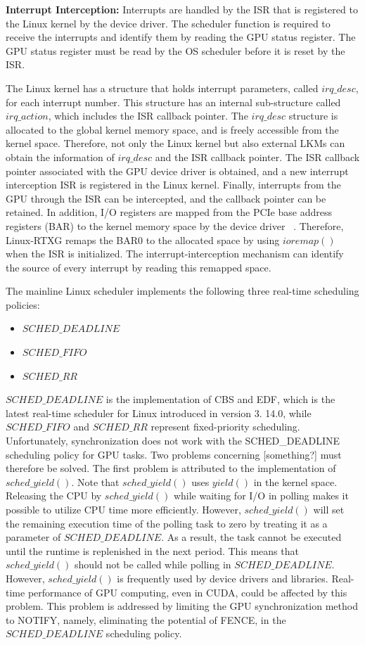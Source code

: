 \textbf{Interrupt Interception:} Interrupts are handled by the ISR that is registered to the Linux kernel by the device driver.
The scheduler function is required to receive the interrupts and identify them by reading the GPU status register.
The GPU status register must be read by the OS scheduler before it is reset by the ISR.

The Linux kernel has a structure that holds interrupt parameters, called $irq\_desc$, for each interrupt number.
This structure has an internal sub-structure called $irq\_action$, which includes the ISR callback pointer.
The $irq\_desc$ structure is allocated to the global kernel memory space, and is freely accessible from the kernel space.
Therefore, not only the Linux kernel but also external LKMs can obtain the information of $irq\_desc$ and the ISR callback pointer.
The ISR callback pointer associated with the GPU device driver is obtained, and a new interrupt interception ISR is registered in the Linux kernel.
Finally, interrupts from the GPU through the ISR can be intercepted, and the callback pointer can be retained.
In addition, I/O registers are mapped from the PCIe base address registers (BAR) to the kernel memory space by the device driver ~\cite{fujii:icpads2013,kato2013zero}.
Therefore, Linux-RTXG remaps the BAR0 to the allocated space by using $ioremap()$ when the ISR is initialized.
The interrupt-interception mechanism can identify the source of every interrupt by reading this remapped space.


The mainline Linux scheduler implements the following three real-time scheduling policies:
\begin{itemize}
\item $SCHED\_DEADLINE$
\item $SCHED\_FIFO$
\item $SCHED\_RR$
\end{itemize}

$SCHED\_DEADLINE$ is the implementation of CBS and EDF, which is the latest real-time scheduler for Linux introduced in version 3.
14.0, while $SCHED\_FIFO$ and $SCHED\_RR$ represent fixed-priority scheduling.
Unfortunately, synchronization does not work with the SCHED\_DEADLINE scheduling policy for GPU tasks.
Two problems concerning [something?] must therefore be solved.
The first problem is attributed to the implementation of $sched\_yield()$.
Note that $sched\_yield()$ uses $yield()$ in the kernel space.
Releasing the CPU by $sched\_yield()$ while waiting for I/O in polling makes it possible to utilize CPU time more efficiently.
However, $sched\_yield()$ will set the remaining execution time of the polling task to zero by treating it as a parameter of $SCHED\_DEADLINE$.
As a result, the task cannot be executed until the runtime is replenished in the next period.
This means that $sched\_yield()$ should not be called while polling in $SCHED\_DEADLINE$.
However, $sched\_yield()$ is frequently used by device drivers and libraries.
Real-time performance of GPU computing, even in CUDA, could be affected by this problem.
This problem is addressed by limiting the GPU synchronization method to NOTIFY, namely, eliminating the potential of FENCE, in the $SCHED\_DEADLINE$ scheduling policy.

